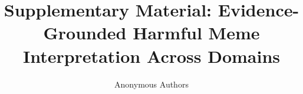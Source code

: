 \documentclass[sigconf,anonymous,review]{acmart}
\begin{document}
\title{Supplementary Material: Evidence-Grounded Harmful Meme Interpretation Across Domains}
\author{Anonymous Authors}
\maketitle













\end{document}
